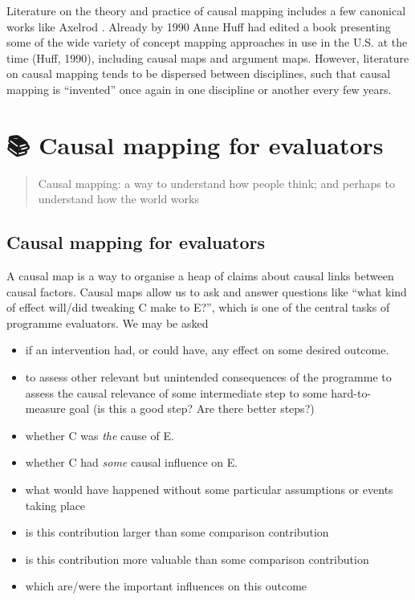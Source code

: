 \documentclass[
]{book}
\begin{document}
Literature on the theory and practice of causal mapping includes a few canonical works like Axelrod \citep{axelrod2015}. Already by 1990 Anne Huff had edited a book presenting some of the wide variety of concept mapping approaches in use in the U.S. at the time (Huff, 1990), including causal maps and argument maps. However, literature on causal mapping tends to be dispersed between disciplines, such that causal mapping is ``invented'' once again in one discipline or another every few years.

\hypertarget{mapping}{%
\chapter{📚 Causal mapping for evaluators}\label{mapping}}

\begin{quote}
Causal mapping: a way to understand how people think; and perhaps to understand how the world works
\end{quote}

\hypertarget{causal-mapping-for-evaluators}{%
\section{Causal mapping for evaluators}\label{causal-mapping-for-evaluators}}

A causal map is a way to organise a heap of claims about causal links between causal factors. Causal maps allow us to ask and answer questions like ``what kind of effect will/did tweaking C make to E?'', which is one of the central tasks of programme evaluators. We may be asked

\begin{itemize}
\item
  if an intervention had, or could have, any effect on some desired outcome.
\item
  to assess other relevant but unintended consequences of the programme to assess the causal relevance of some intermediate step to some hard-to-measure goal (is this a good step? Are there better steps?)
\item
  whether C was \emph{the} cause of E.
\item
  whether C had \emph{some} causal influence on E.
\item
  what would have happened without some particular assumptions or events taking place
\item
  is this contribution larger than some comparison contribution
\item
  is this contribution more valuable than some comparison contribution
\item
  which are/were the important influences on this outcome
\end{itemize}
\end{document}
